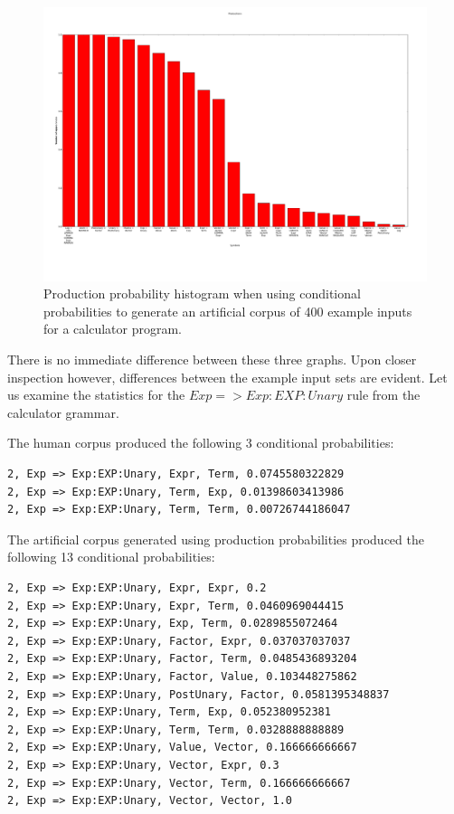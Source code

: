 \begin{figure}
    \begin{center}

\includegraphics[scale=0.23]{figs/gen/production_probability_histogram.png}
    \end{center}
        \caption{Production probability histogram when using conditional
probabilities to generate an artificial corpus of 400 example inputs for a
calculator program.}
    \label{times}
\end{figure}


There is no immediate difference between these three graphs. Upon closer
inspection however, differences between the example input sets are evident. Let
us examine the statistics for the $Exp => Exp:EXP:Unary$ rule from the
calculator grammar.

The human corpus produced the following 3 conditional probabilities: \\

\noindent
\begin{verbatim}
2, Exp => Exp:EXP:Unary, Expr, Term, 0.0745580322829
2, Exp => Exp:EXP:Unary, Term, Exp, 0.01398603413986
2, Exp => Exp:EXP:Unary, Term, Term, 0.00726744186047
\end{verbatim}


The artificial corpus generated using production probabilities produced the
following 13 conditional probabilities: \\

\noindent
\begin{verbatim}
2, Exp => Exp:EXP:Unary, Expr, Expr, 0.2
2, Exp => Exp:EXP:Unary, Expr, Term, 0.0460969044415
2, Exp => Exp:EXP:Unary, Exp, Term, 0.0289855072464
2, Exp => Exp:EXP:Unary, Factor, Expr, 0.037037037037
2, Exp => Exp:EXP:Unary, Factor, Term, 0.0485436893204
2, Exp => Exp:EXP:Unary, Factor, Value, 0.103448275862
2, Exp => Exp:EXP:Unary, PostUnary, Factor, 0.0581395348837
2, Exp => Exp:EXP:Unary, Term, Exp, 0.052380952381
2, Exp => Exp:EXP:Unary, Term, Term, 0.0328888888889
2, Exp => Exp:EXP:Unary, Value, Vector, 0.166666666667
2, Exp => Exp:EXP:Unary, Vector, Expr, 0.3
2, Exp => Exp:EXP:Unary, Vector, Term, 0.166666666667
2, Exp => Exp:EXP:Unary, Vector, Vector, 1.0
\end{verbatim}

